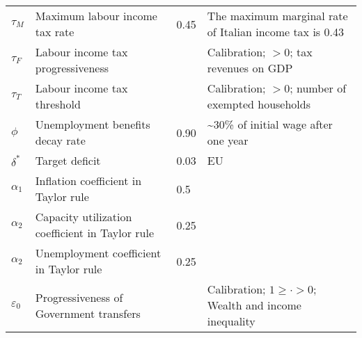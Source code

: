 \documentclass[a4paper, headings=standardclasses]{scrartcl}
\numberwithin{equation}{subsection}
\begin{document}
\begin{xltabular}{\linewidth}{lXlX}
    $\tau_M$                     & Maximum labour income tax rate                               & 0.45   &  The maximum marginal rate of Italian income tax is 0.43                                                   \\
    $\tau_F$                     & Labour income tax progressiveness                              &       & Calibration; $>0$; tax revenues on GDP                                                                                                                                                           \\
    $\tau_T$                     & Labour income tax threshold                                  &       & Calibration; $>0$; number of exempted households                                                                                                                                                             \\
    $\phi$                       & Unemployment benefits decay rate                             & 0.90  & \textasciitilde 30\% of initial wage after one year                                                                                                                                                            \\
    $\delta^*$                   & Target deficit                                               & 0.03  & EU                                                                                                                                                            \\
    $\alpha_1$                   & Inflation coefficient in Taylor rule                         & 0.5      &                                                                                                                                                             \\
    $\alpha_2$                   & Capacity utilization coefficient in Taylor rule              & 0.25      &                                                                                                                                                             \\
    $\alpha_2$                   & Unemployment coefficient in Taylor rule                      & 0.25      &                                                                                                                                                             \\
    $\varepsilon_0$                   & Progressiveness of Government transfers                   &  & Calibration; $1 \ge \cdot > 0$; Wealth and income inequality                                                                                                                                                             \\

\end{xltabular}
\end{document}
